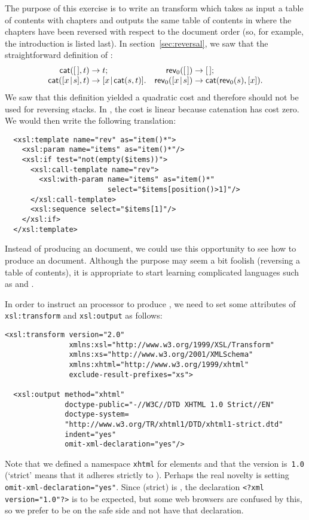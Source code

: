 
The purpose of this exercise is to write an \XSLT transform which
takes as input a table of contents with chapters and outputs the same
table of contents in \XML where the chapters have been reversed with
respect to the document order (so, for example, the introduction is
listed last). In section~\vref{sec:reversal}, we saw that the
straightforward definition of :
\begin{equation*}
\begin{array}{@{}r@{\;}l@{\;}lr@{\;}l@{\;}l@{}}
  \fun{cat}(\el,t)\index{cat@\fun{cat/2}}
& \rightarrow & t;
& \fun{rev}_0(\el)
& \rightarrow & \el;\\
  \fun{cat}(\cons{x}{s},t)
& \rightarrow & \cons{x}{\fun{cat}(s,t)}.
& \fun{rev}_0(\cons{x}{s})
& \rightarrow & \fun{cat}(\fun{rev}_0(s),[x]).
\end{array}
\end{equation*}
We saw that this definition yielded a quadratic cost and therefore
should not be used for reversing stacks. In \XSLT, the cost is linear
because catenation has cost zero. We would then write the following
translation:
\begin{verbatim}
  <xsl:template name="rev" as="item()*">
    <xsl:param name="items" as="item()*"/>
    <xsl:if test="not(empty($items))">
      <xsl:call-template name="rev">
        <xsl:with-param name="items" as="item()*"
                        select="$items[position()>1]"/>
      </xsl:call-template>
      <xsl:sequence select="$items[1]"/>
    </xsl:if>
  </xsl:template>
\end{verbatim}
Instead of producing an \XML document, we could use this opportunity
to see how to produce an \XHTML document. Although the purpose may
seem a bit foolish (reversing a table of contents), it is appropriate
to start learning complicated languages such as \XSLT and \XHTML.

In order to instruct an \XSLT processor to produce \XHTML, we need to
set some attributes of \texttt{xsl:transform} and \texttt{xsl:output}
as follows:
\begin{verbatim}
<xsl:transform version="2.0"
               xmlns:xsl="http://www.w3.org/1999/XSL/Transform"
               xmlns:xs="http://www.w3.org/2001/XMLSchema"
               xmlns:xhtml="http://www.w3.org/1999/xhtml"
               exclude-result-prefixes="xs">

  <xsl:output method="xhtml"
              doctype-public="-//W3C//DTD XHTML 1.0 Strict//EN"
              doctype-system=
              "http://www.w3.org/TR/xhtml1/DTD/xhtml1-strict.dtd"
              indent="yes"
              omit-xml-declaration="yes"/>
\end{verbatim}
Note that we defined a namespace \texttt{xhtml} for \XHTML elements
and that the \XHTML version is~\texttt{1.0} (`strict' means that it
adheres strictly to \XML). Perhaps the real novelty is setting
\texttt{omit-xml-declaration="yes"}. Since \XHTML (strict) is \XML,
the declaration \texttt{<?xml version="1.0"?>} is to be expected, but
some web browsers are confused by this, so we prefer to be on the safe
side and not have that declaration.

